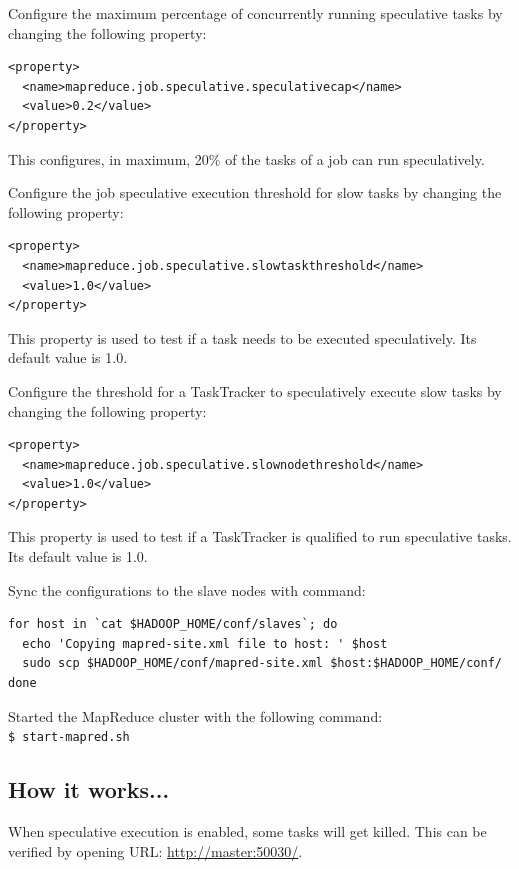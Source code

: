 Configure the maximum percentage of concurrently running speculative tasks by changing the following property:
\lstset{style=bashstyle}
\begin{lstlisting}
<property>
  <name>mapreduce.job.speculative.speculativecap</name>
  <value>0.2</value>
</property>
\end{lstlisting}
This configures, in maximum, 20\% of the tasks of a job can run speculatively.


Configure the job speculative execution threshold for slow tasks by changing the following property:
\lstset{style=bashstyle}
\begin{lstlisting}
<property>
  <name>mapreduce.job.speculative.slowtaskthreshold</name>
  <value>1.0</value>
</property>
\end{lstlisting}

This property is used to test if a task needs to be executed speculatively. Its default value is 1.0.


Configure the threshold for a TaskTracker to speculatively execute slow tasks by changing the following property:
\lstset{style=bashstyle}
\begin{lstlisting}
<property>
  <name>mapreduce.job.speculative.slownodethreshold</name>
  <value>1.0</value>
</property>
\end{lstlisting}
This property is used to test if a TaskTracker is qualified to run speculative tasks. Its default value is 1.0.


Sync the configurations to the slave nodes with command:
\lstset{style=bashstyle}
\begin{lstlisting}
for host in `cat $HADOOP_HOME/conf/slaves`; do
  echo 'Copying mapred-site.xml file to host: ' $host
  sudo scp $HADOOP_HOME/conf/mapred-site.xml $host:$HADOOP_HOME/conf/
done
\end{lstlisting}

Started the MapReduce cluster with the following command:\\
\verb|$ start-mapred.sh|

\subsection*{How it works...}
When speculative execution is enabled, some tasks will get killed. This can be verified by opening URL: \url{http://master:50030/}.

